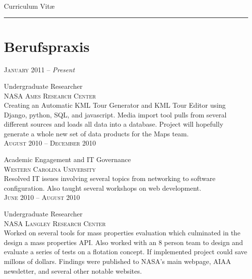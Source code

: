 \documentclass[10pt]{article}
\begin{document}
\color{text1} %

   \par{\\
      \color{headings} Curriculum  {Vit\ae}\\[25pt]\par
      {\color{white} \hrule}} %

\begin{minipage}[t]{0.5\textwidth} %

\vspace{0pt}   %

\section{Berufspraxis}
   \raggedleft
   \textsc{January 2011} -- \emph{Present}\par
   \raggedright\large Undergraduate Researcher\\
   \textsc{NASA Ames Research Center}\\
   \normalsize{Creating an Automatic KML Tour Generator and KML Tour Editor using Django, python, SQL, and javascript. Media import tool pulls from several different sources and loads all data into a database. Project will hopefully generate a whole new set of data products for the Maps team.}\\[5pt]

   \raggedleft
   \textsc{August 2010 -- December 2010}\par
   \raggedright\large Academic Engagement and IT Governance\\
   \textsc{Western Carolina University}\\
   \normalsize{Resolved IT issues involving several topics from networking to software configuration. Also taught several workshops on web development.}\\[5pt]

   \raggedleft
   \textsc{\normalsize June 2010 -- August 2010}\par
   \raggedright\large Undergraduate Researcher\\
   \textsc{NASA Langley Research Center}\\
   \normalsize{Worked on several tools for mass properties evaluation which culminated in the design a mass properties API. Also worked with an 8 person team to design and evaluate a series of tests on a flotation concept. If implemented project could save millons of dollars. Findings were published to NASA's main webpage, AIAA newsletter, and several other notable websites.}\\[5pt]


\end{minipage}
\end{document}

